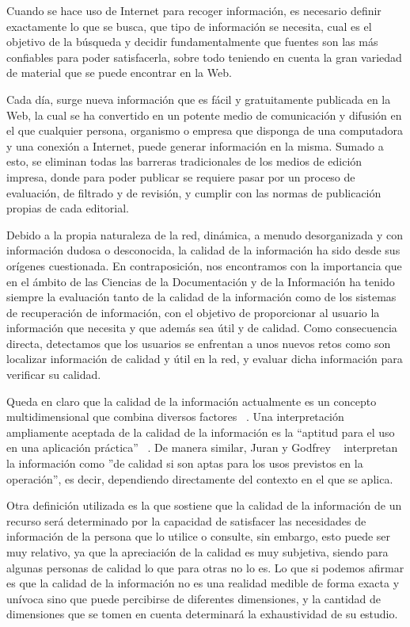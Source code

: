 Cuando se hace uso de Internet para recoger informaci\'on, es necesario definir exactamente lo que se busca, que tipo de informaci\'on se necesita, cual es el objetivo de la b\'usqueda  y decidir fundamentalmente que fuentes son las m\'as confiables para poder satisfacerla, sobre todo teniendo en cuenta la gran variedad de material que se puede encontrar en la Web.

Cada d\'ia, surge nueva informaci\'on que es f\'acil y gratuitamente publicada en la Web, la cual se ha convertido en un potente medio de comunicaci\'on y difusi\'on en el que cualquier persona, organismo o empresa que disponga de una computadora y una conexi\'on a Internet, puede generar informaci\'on en la misma. Sumado a esto, se eliminan todas las barreras tradicionales de los medios de edici\'on impresa, donde para poder publicar se requiere pasar por un proceso de evaluaci\'on, de filtrado y de revisi\'on, y cumplir con las normas de publicaci\'on propias de cada editorial.

Debido a la propia naturaleza de la red, din\'amica, a menudo desorganizada y con informaci\'on dudosa o desconocida, la calidad de la informaci\'on ha sido desde sus or\'igenes cuestionada. En contraposici\'on, nos encontramos con la importancia que en el \'ambito de las Ciencias de la Documentaci\'on y de la Informaci\'on ha tenido siempre la evaluaci\'on tanto de la calidad de la informaci\'on como de los sistemas de recuperaci\'on de informaci\'on, con el objetivo de proporcionar al usuario la informaci\'on que necesita y que adem\'as sea \'util y de calidad. Como consecuencia directa, detectamos que los usuarios se enfrentan a unos nuevos retos como son localizar informaci\'on de calidad y \'util en la red, y evaluar dicha informaci\'on para verificar su calidad.

Queda en claro que la calidad de la informaci\'on actualmente es un concepto multidimensional que combina diversos factores ~\cite{WanStr:96}.
Una interpretaci\'on ampliamente aceptada de la calidad de la informaci\'on es la  ``aptitud para el uso en una aplicaci\'on pr\'actica''  ~\cite{WanStr:96}. De manera similar, Juran y Godfrey ~\cite{JurGod:99} interpretan la informaci\'on como ''de calidad si son aptas para los usos previstos en la operaci\'on'', es decir, dependiendo directamente del contexto en el que se aplica.

Otra definici\'on utilizada es la que sostiene que la calidad de la informaci\'on de un recurso ser\'a determinado por la capacidad de satisfacer las necesidades de informaci\'on de la persona que lo utilice o consulte, sin embargo, esto puede ser muy relativo, ya que la apreciaci\'on de la calidad es muy subjetiva, siendo para algunas personas de calidad lo que para otras no lo es. Lo que si podemos afirmar es que la calidad de la informaci\'on no es una realidad  medible de forma exacta y un\'ivoca sino que puede percibirse de diferentes dimensiones, y la cantidad de dimensiones que se tomen en cuenta determinar\'a la exhaustividad de su estudio.

